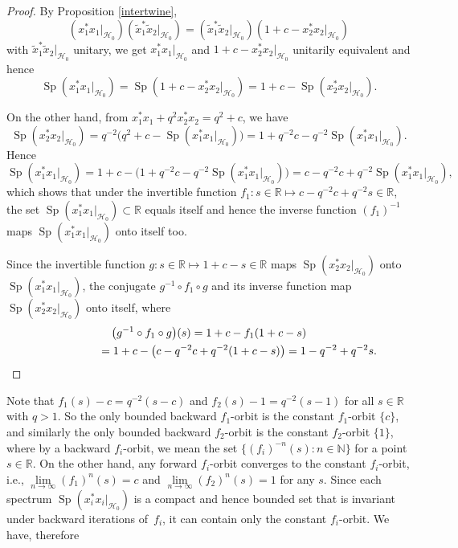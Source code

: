 \documentclass[pdftex]{sigma}
\begin{document}
\begin{proof} By Proposition \ref{intertwine},
\[
( x_{1}^{\ast}x_{1}|_{\mathcal{H}_{0}}) ( \tilde{x}%
_{1}^{\ast}\tilde{x}_{2}|_{\mathcal{H}_{0}}) =( \tilde{x}%
_{1}^{\ast}\tilde{x}_{2}|_{\mathcal{H}_{0}}) ( 1+c-x_{2}^{\ast
}x_{2}|_{\mathcal{H}_{0}})
\]
with $\tilde{x}_{1}^{\ast}\tilde{x}_{2}|_{\mathcal{H}_{0}}$ unitary, we get
$x_{1}^{\ast}x_{1}|_{\mathcal{H}_{0}}$ and $1+c-x_{2}^{\ast}x_{2}%
|_{\mathcal{H}_{0}}$ unitarily equivalent and hence
\[
\operatorname{Sp}( x_{1}^{\ast}x_{1}|_{\mathcal{H}_{0}})
=\operatorname{Sp}( 1+c-x_{2}^{\ast}x_{2}|_{\mathcal{H}_{0}})
=1+c-\operatorname{Sp}( x_{2}^{\ast}x_{2}|_{\mathcal{H}_{0}}) .
\]

On the other hand, from $x_{1}^{\ast}x_{1}+q^{2}x_{2}^{\ast}x_{2}=q^{2}+c$, we
have
\[
\operatorname{Sp}( x_{2}^{\ast}x_{2}|_{\mathcal{H}_{0}})
=q^{-2}\big( q^{2}+c-\operatorname{Sp}( x_{1}^{\ast}x_{1}
|_{\mathcal{H}_{0}}) \big) =1+q^{-2}c-q^{-2}\operatorname{Sp}
( x_{1}^{\ast}x_{1}|_{\mathcal{H}_{0}}) .
\]
Hence
\[
\operatorname{Sp}( x_{1}^{\ast}x_{1}|_{\mathcal{H}_{0}})
=1+c-\big( 1+q^{-2}c-q^{-2}\operatorname{Sp}( x_{1}^{\ast}
x_{1}|_{\mathcal{H}_{0}}) \big) =c-q^{-2}c+q^{-2}\operatorname{Sp}
( x_{1}^{\ast}x_{1}|_{\mathcal{H}_{0}}) ,
\]
which shows that under the invertible function $f_{1}\colon s\in\mathbb{R}\mapsto
c-q^{-2}c+q^{-2}s\in\mathbb{R}$, the set $\operatorname{Sp}(
x_{1}^{\ast}x_{1}|_{\mathcal{H}_{0}}) \subset\mathbb{R}$ equals itself
and hence the inverse function $( f_{1}) ^{-1}$ maps
$\operatorname{Sp}( x_{1}^{\ast}x_{1}|_{\mathcal{H}_{0}}) $ onto
itself too.

Since the invertible function $g\colon s\in\mathbb{R}\mapsto1+c-s\in\mathbb{R}$ maps
$\operatorname{Sp}( x_{2}^{\ast}x_{2}|_{\mathcal{H}_{0}}) $ onto
$\operatorname{Sp}( x_{1}^{\ast}x_{1}|_{\mathcal{H}_{0}}) $, the
conjugate $g^{-1}\circ f_{1}\circ g$ and its inverse function map
$\operatorname{Sp}( x_{2}^{\ast}x_{2}|_{\mathcal{H}_{0}}) $ onto
itself, where
\begin{gather*}
\big( g^{-1}\circ f_{1}\circ g\big) (s) =1+c-f_{1}(1+c-s)\\
\hphantom{\big( g^{-1}\circ f_{1}\circ g\big) (s)}{}
=1+c-\big( c-q^{-2}c+q^{-2} ( 1+c-s ) \big) =1-q^{-2}%
+q^{-2}s.\tag*{\qed}
\end{gather*}\renewcommand{\qed}{}
\end{proof}

Note that $f_{1}(s) -c=q^{-2}(s-c) $ and
$f_{2}(s) -1=q^{-2}(s-1) $ for all $s\in
\mathbb{R}$ with $q>1$. So the only bounded backward $f_{1}$-orbit is the
constant $f_{1}$-orbit $\{c\} $, and similarly the only bounded
backward $f_{2}$-orbit is the constant $f_{2}$-orbit $\{1\} $,
where by a backward $f_{i}$-orbit, we mean the set $ \{ (
f_{i} ) ^{-n}(s) \colon n\in\mathbb{N} \} $ for a point
$s\in\mathbb{R}$. On the other hand, any forward $f_{i}$-orbit converges to
the constant $f_{i}$-orbit, i.e., $\lim\limits_{n\rightarrow\infty}(
f_{1}) ^{n}(s) =c$ and $\lim\limits_{n\rightarrow\infty}(
f_{2}) ^{n}(s) =1$ for any $s$. Since each spectrum $\operatorname{Sp}( x_{i}^{\ast}%
x_{i}|_{\mathcal{H}_{0}}) $ is a compact and hence bounded set that is
invariant under backward iterations of~$f_{i}$, it can contain only the
constant $f_{i}$-orbit. We have, therefore
\end{document}
